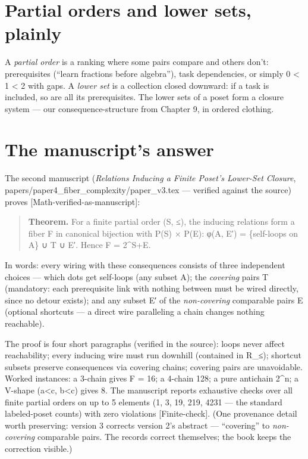 \documentclass[
  11pt,
]{book}
\begin{document}
\section{Partial orders and lower sets,
plainly}\label{partial-orders-and-lower-sets-plainly}

A \emph{partial order} is a ranking where some pairs compare and others
don't: prerequisites (``learn fractions before algebra''), task
dependencies, or simply 0 \textless{} 1 \textless{} 2 with gaps. A
\emph{lower set} is a collection closed downward: if a task is included,
so are all its prerequisites. The lower sets of a poset form a closure
system --- our consequence-structure from Chapter 9, in ordered
clothing.

\section{The manuscript's answer}\label{the-manuscripts-answer}

The second manuscript (\emph{Relations Inducing a Finite Poset's
Lower-Set Closure}, papers/paper4\_fiber\_complexity/paper\_v3.tex ---
verified against the source) proves {[}Math-verified-as-manuscript{]}:

\begin{quote}
\textbf{Theorem.} For a finite partial order (S, ≤), the inducing
relations form a fiber F in canonical bijection with P(S) × P(E): φ(A,
E′) = \{self-loops on A\} ∪ T ∪ E′. Hence \textbar F\textbar{} =
2\^{}\textbar S\textbar+\textbar E\textbar.
\end{quote}

In words: every wiring with these consequences consists of three
independent choices --- which dots get self-loops (any subset A); the
\emph{covering} pairs T (mandatory: each prerequisite link with nothing
between must be wired directly, since no detour exists); and any subset
E′ of the \emph{non-covering} comparable pairs E (optional shortcuts ---
a direct wire paralleling a chain changes nothing reachable).

The proof is four short paragraphs (verified in the source): loops never
affect reachability; every inducing wire must run downhill (contained in
R\_≤); shortcut subsets preserve consequences via covering chains;
covering pairs are unavoidable. Worked instances: a 3-chain gives
\textbar F\textbar{} = 16; a 4-chain 128; a pure antichain 2\^{}n; a
V-shape (a\textless c, b\textless c) gives 8. The manuscript reports
exhaustive checks over all finite partial orders on up to 5 elements (1,
3, 19, 219, 4231 --- the standard labeled-poset counts) with zero
violations {[}Finite-check{]}. (One provenance detail worth preserving:
version 3 corrects version 2's abstract --- ``covering'' to
\emph{non-covering} comparable pairs. The records correct themselves;
the book keeps the correction visible.)
\end{document}
